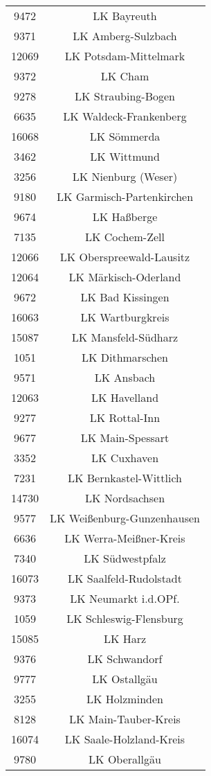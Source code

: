 \begin{tabular}{c c}
    9472&LK Bayreuth\\ 
    9371&LK Amberg-Sulzbach\\ 
    12069&LK Potsdam-Mittelmark\\ 
    9372&LK Cham\\ 
    9278&LK Straubing-Bogen\\ 
    6635&LK Waldeck-Frankenberg\\ 
    16068&LK Sömmerda\\ 
    3462&LK Wittmund\\ 
    3256&LK Nienburg (Weser)\\ 
    9180&LK Garmisch-Partenkirchen\\ 
    9674&LK Haßberge\\ 
    7135&LK Cochem-Zell\\ 
    12066&LK Oberspreewald-Lausitz\\ 
    12064&LK Märkisch-Oderland\\ 
    9672&LK Bad Kissingen\\ 
    16063&LK Wartburgkreis\\ 
    15087&LK Mansfeld-Südharz\\ 
    1051&LK Dithmarschen\\ 
    9571&LK Ansbach\\ 
    12063&LK Havelland\\ 
    9277&LK Rottal-Inn\\ 
    9677&LK Main-Spessart\\ 
    3352&LK Cuxhaven\\ 
    7231&LK Bernkastel-Wittlich\\ 
    14730&LK Nordsachsen\\ 
    9577&LK Weißenburg-Gunzenhausen\\ 
    6636&LK Werra-Meißner-Kreis\\ 
    7340&LK Südwestpfalz\\ 
    16073&LK Saalfeld-Rudolstadt\\ 
    9373&LK Neumarkt i.d.OPf.\\ 
    1059&LK Schleswig-Flensburg\\ 
    15085&LK Harz\\ 
    9376&LK Schwandorf\\ 
    9777&LK Ostallgäu\\ 
    3255&LK Holzminden\\ 
    8128&LK Main-Tauber-Kreis\\ 
    16074&LK Saale-Holzland-Kreis\\ 
    9780&LK Oberallgäu\\ 

\end{tabular}
